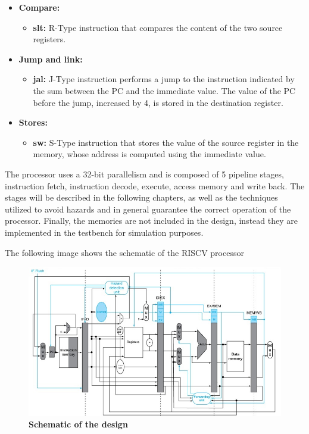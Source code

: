 \begin{itemize}
    \item \textbf{Compare:}
    \begin{itemize}
        \item \textbf{slt:} R-Type instruction that compares the content of the two source registers.
    \end{itemize}
    \item \textbf{Jump and link:}
    \begin{itemize}
        \item \textbf{jal:} J-Type instruction performs a jump to the instruction indicated by the sum between the PC and the immediate value. The value of the PC before the jump, 
        increased by 4, is stored in the destination register.
    \end{itemize}
    \item \textbf{Stores:}
    \begin{itemize}
        \item \textbf{sw:} S-Type instruction that stores the value of the source register in the memory, whose address is computed using the immediate value.
    \end{itemize}
\end{itemize}

    The processor uses a 32-bit parallelism and is composed of 5 pipeline stages, instruction fetch, instruction decode, execute, access memory and write back.
    The stages will be described in the following chapters, as well as the techniques utilized to avoid hazards and in general guarantee the correct operation of the processor. 
    Finally, the memories are not included in the design, instead they are implemented in the testbench for simulation purposes.

    The following image shows the schematic of the RISCV processor
    \begin{figure}[!h]
        \centering
            \includegraphics[width=\linewidth]{schematic/schematic.jpg}
            \caption{\textbf{Schematic of the design}}
    \end{figure}
        